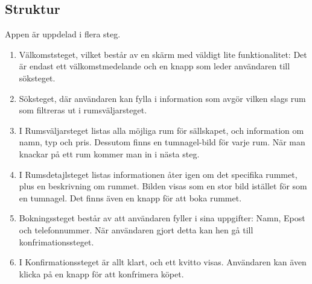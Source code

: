 \documentclass[a4paper]{article}
\begin{document}
\subsection{Struktur}
Appen är uppdelad i flera steg.
\begin{enumerate}
\item Välkomststeget, vilket består av en skärm med väldigt lite funktionalitet: Det är endast ett välkomstmedelande och en knapp som leder användaren till söksteget.
\item Söksteget, där användaren kan fylla i information som avgör vilken slags rum som filtreras ut i rumsväljarsteget.
\item I Rumsväljarsteget listas alla möjliga rum för sällskapet, och information om namn, typ och pris. Dessutom finns en tumnagel-bild för varje rum. När man knackar på ett rum kommer man in i nästa steg.
\item I Rumsdetajlsteget listas informationen åter igen om det specifika rummet, plus en beskrivning om rummet. Bilden visas som en stor bild istället för som en tumnagel. Det finns även en knapp för att boka rummet.
\item Bokningssteget består av att användaren fyller i sina uppgifter: Namn, Epost och telefonnummer. När användaren gjort detta kan hen gå till konfrimationssteget.
\item I Konfirmationssteget är allt klart, och ett kvitto visas. Användaren kan även klicka på en knapp för att konfrimera köpet. 
\end{enumerate}
\end{document}
